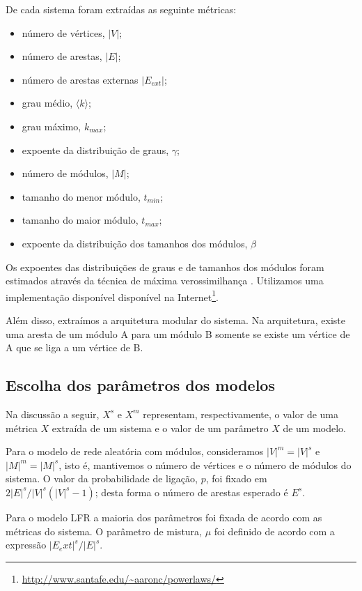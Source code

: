 \documentclass{acm_proc_article-sp}
\begin{document}
De cada sistema foram extraídas as seguinte métricas:

\begin{itemize}
\item número de vértices, $|V|$;
\item número de arestas, $|E|$;
\item número de arestas externas $|E_{ext}|$;
\item grau médio, $\langle k \rangle$;
\item grau máximo, $k_{max}$;
\item expoente da distribuição de graus, $\gamma$;
\item número de módulos, $|M|$;
\item tamanho do menor módulo, $t_{min}$;
\item tamanho do maior módulo, $t_{max}$;
\item expoente da distribuição dos tamanhos dos módulos, $\beta$
\end{itemize}

Os expoentes das distribuições de graus e de tamanhos dos módulos foram estimados através da técnica de máxima verossimilhança \cite{Clauset2007}. Utilizamos uma implementação disponível disponível na Internet\footnote{\url{http://www.santafe.edu/~aaronc/powerlaws/}}. 

Além disso, extraímos a arquitetura modular do sistema. Na arquitetura, existe uma aresta de um módulo A para um módulo B somente se existe um vértice de A que se liga a um vértice de B.

\subsection{Escolha dos parâmetros dos modelos}

Na discussão a seguir, $X^s$ e $X^m$ representam, respectivamente, o valor de uma métrica $X$ extraída de um sistema e o valor de um parâmetro $X$ de um modelo.

Para o modelo de rede aleatória com módulos, consideramos $|V|^m = |V|^s$ e $|M|^m = |M|^s$, isto é,  mantivemos o número de vértices e o número de módulos do sistema. O valor da probabilidade de ligação, $p$, foi fixado em $2|E|^s / |V|^s(|V|^s-1)$; desta forma o número de arestas esperado é $E^s$.

Para o modelo LFR a maioria dos parâmetros foi fixada de acordo com as métricas do sistema. O parâmetro de mistura, $\mu$ foi definido de acordo com a expressão $|E_ext|^s / |E|^s$.
\end{document}
